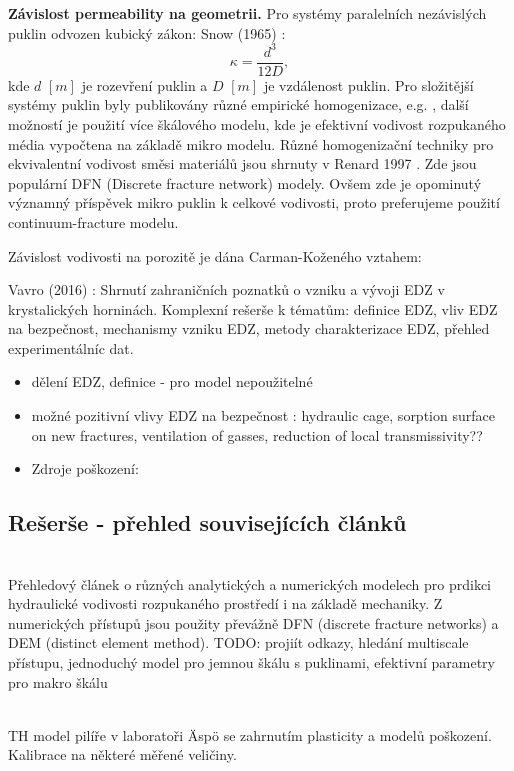 \documentclass{article}
\begin{document}
{\bf Závislost permeability na geometrii.} Pro systémy paralelních nezávislých puklin odvozen kubický zákon: Snow (1965) \cite{Snow1965}:
\[
    \kappa=\frac{d^3}{12 D},
\] 
kde $d$ $[m]$ je rozevření puklin a $D$ $[m]$ je vzdálenost puklin. Pro složitější systémy puklin byly publikovány různé empirické homogenizace, e.g. \cite{Pouya2011}, další možností je použití více škálového modelu, kde je efektivní vodivost rozpukaného média vypočtena na základě mikro modelu. 
Různé homogenizační techniky pro ekvivalentní vodivost směsi materiálů jsou shrnuty v Renard 1997 \cite{Renard1997}.
Zde jsou populární DFN (Discrete fracture network) modely. Ovšem zde je opominutý významný příspěvek mikro puklin k celkové vodivosti, proto preferujeme použití continuum-fracture modelu.


Závislost vodivosti na porozitě je dána Carman-Koženého vztahem:

Vavro (2016) \cite{Vavro2016}: Shrnutí zahraničních poznatků o vzniku a vývoji EDZ v krystalických horninách. Komplexní rešerše k tématům: definice EDZ, vliv EDZ na bezpečnost, mechanismy vzniku EDZ, metody charakterizace EDZ, přehled experimentálníc dat.

\begin{itemize}
    \item dělení EDZ, definice - pro model nepoužitelné
    \item možné pozitivní vlivy EDZ na bezpečnost \cite{Lanyon2011}: hydraulic cage, sorption surface on new fractures, ventilation of gasses, reduction of local transmissivity??
    \item Zdroje poškození:
    
\end{itemize}




\subsection{Rešerše - přehled souvisejících článků}
{\bf \cite{Shahbazi2020a}}\\
Přehledový článek o různých analytických a numerických modelech 
pro prdikci hydraulické vodivosti rozpukaného prostředí i na základě mechaniky. Z numerických přístupů 
jsou použity převážně DFN (discrete fracture networks) a DEM (distinct element method). 
TODO: projiít odkazy, hledání multiscale přístupu, jednoduchý model pro jemnou škálu s puklinami, 
efektivní parametry pro makro škálu

\\
TH model pilíře v laboratoři \"Asp\"o se zahrnutím plasticity a modelů poškození. 
Kalibrace na některé měřené veličiny.
\end{document}
